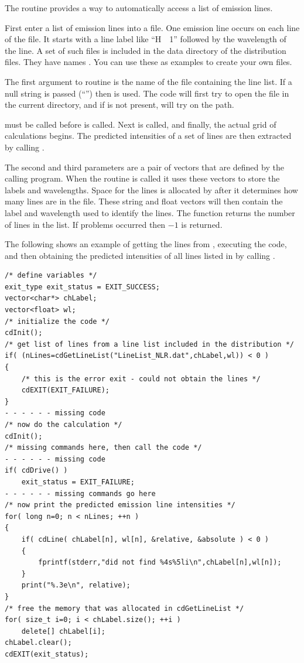 The routine  provides a way
to automatically access a list of emission lines.

First enter a list of emission lines into a file.
One emission line
occurs on each line of the file.  It starts with a line label like
``H~~1'' followed by the wavelength of the line.
A set of such files is included
in the data directory of the distribution files.  They have names
.  You can use these as examples to create your own files.

The first argument to routine  is the name of the file
containing the line list.  If a null string is passed (``'') then
 is used.  The code will first try to open the file in the
current directory, and if is not present, will try on the path.

 must be called before  is called.
Next 
is called, and finally, the actual grid of calculations begins.  The
predicted intensities of a set of lines are then extracted by calling
.

The second and third parameters are a pair of vectors that are defined
by the calling program.
When the routine  is called it uses these
vectors to store the labels and wavelengths.
Space for the lines is allocated by  after it determines how
many lines are in the file.  These string and float vectors will then contain
the label and wavelength used to identify the lines.  The function returns
the number of lines in the list.  If problems occurred then $-1$ is returned.

The following shows an example of getting the lines from
,
executing the code, and then obtaining the predicted intensities of all
lines listed in 
by calling .
\begin{verbatim}
/* define variables */
exit_type exit_status = EXIT_SUCCESS;
vector<char*> chLabel;
vector<float> wl;
/* initialize the code */
cdInit();
/* get list of lines from a line list included in the distribution */
if( (nLines=cdGetLineList("LineList_NLR.dat",chLabel,wl)) < 0 )
{
    /* this is the error exit - could not obtain the lines */
    cdEXIT(EXIT_FAILURE);
}
- - - - - - missing code
/* now do the calculation */
cdInit();
/* missing commands here, then call the code */
- - - - - - missing code
if( cdDrive() )
    exit_status = EXIT_FAILURE;
- - - - - - missing commands go here
/* now print the predicted emission line intensities */
for( long n=0; n < nLines; ++n )
{
    if( cdLine( chLabel[n], wl[n], &relative, &absolute ) < 0 )
    {
        fprintf(stderr,"did not find %4s%5li\n",chLabel[n],wl[n]);
    }
    print("%.3e\n", relative);
}
/* free the memory that was allocated in cdGetLineList */
for( size_t i=0; i < chLabel.size(); ++i )
    delete[] chLabel[i];
chLabel.clear();
cdEXIT(exit_status);
\end{verbatim}

